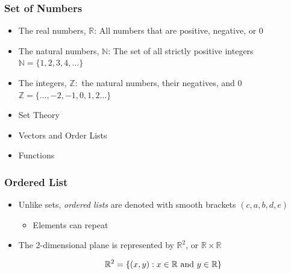\documentclass{beamer}
\numberwithin{equation}{section}
\begin{document}
\begin{frame}
\frametitle{Set of Numbers}

\begin{itemize}
\item The real numbers, $\mathbb{R}$: All numbers that are positive, negative, or 0 \pause

\item The natural numbers, $\mathbb{N}$: The set of all strictly positive integers \\$\mathbb{N}=\{1, 2, 3, 4, ...\}$ \pause

\item The integers, $\mathbb{Z}: $ the natural numbers, their negatives, and 0\\$\mathbb{Z}=\{..., -2, -1, 0, 1, 2 ...\}$
\end{itemize}

\end{frame}



\begin{frame}

\begin{itemize}
\item \textcolor{mygray}{Set Theory}
\item \textcolor{myblack}{Vectors and Order Lists}
\item \textcolor{mygray}{Functions}
\end{itemize}

\end{frame}



\begin{frame}
\frametitle{Ordered List}

\begin{itemize}
\item  Unlike sets, \textit{ordered lists} are denoted with smooth brackets $(c, a, b, d, e)$ \pause
\begin{itemize}
\item Elements can repeat \pause
\end{itemize}
\item The 2-dimensional plane is represented by $\mathbb{R}^2$, or $\mathbb{R}\times \mathbb{R}$

$$\mathbb{R}^2=\{(x, y): x\in \mathbb{R} \hbox{ and }y\in \mathbb{R} \}$$

\end{itemize}

\end{frame}
\end{document}
